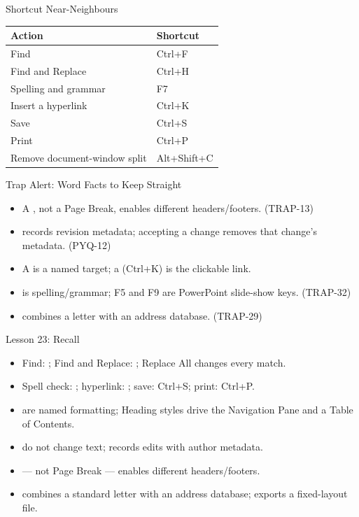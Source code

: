 \documentclass[aspectratio=169]{beamer}
\begin{document}
\begin{frame}{Shortcut Near-Neighbours}
  \begin{center}
    \begin{tabular}{ll}
      \toprule
      \textbf{Action} & \textbf{Shortcut} \\
      \midrule
      Find & Ctrl+F \\
      Find and Replace & Ctrl+H \\
      Spelling and grammar & F7 \\
      Insert a hyperlink & Ctrl+K \\
      Save & Ctrl+S \\
      Print & Ctrl+P \\
      Remove document-window split & Alt+Shift+C \\
      \bottomrule
    \end{tabular}
  \end{center}
\end{frame}

\begin{frame}{Trap Alert: Word Facts to Keep Straight}
  \begin{itemize}
    \item A , not a Page Break, enables different
      headers/footers. (TRAP-13)
    \item {} records revision metadata; accepting a change
      removes that change's metadata. (PYQ-12)
    \item A  is a named target; a  (Ctrl+K) is the
      clickable link.
    \item {} is spelling/grammar; F5 and F9 are PowerPoint slide-show
      keys. (TRAP-32)
    \item {} combines a letter with an address database.
      (TRAP-29)
  \end{itemize}
\end{frame}

\begin{frame}{Lesson 23: Recall}
  \begin{itemize}
    \item Find: ; Find and Replace: ; Replace All
      changes every match.
    \item Spell check: ; hyperlink: ; save: Ctrl+S; print:
      Ctrl+P.
    \item {} are named formatting; Heading styles drive the
      Navigation Pane and a Table of Contents.
    \item {} do not change text;  records edits
      with author metadata.
    \item {} --- not Page Break --- enables different
      headers/footers.
    \item {} combines a standard letter with an address database;
       exports a fixed-layout file.
  \end{itemize}
\end{frame}
\end{document}
